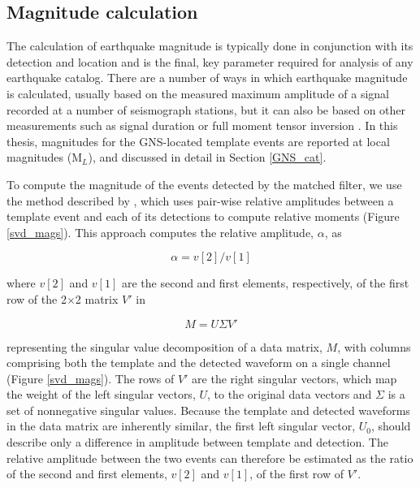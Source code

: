 \subsection{Magnitude calculation}
The calculation of earthquake magnitude is typically done in conjunction with its detection and location and is the final, key parameter required for analysis of any earthquake catalog. There are a number of ways in which earthquake magnitude is calculated, usually based on the measured maximum amplitude of a signal recorded at a number of seismograph stations, but it can also be based on other measurements such as signal duration or full moment tensor inversion \citep{Kanamori_1983}. In this thesis, magnitudes for the GNS-located template events are reported at local magnitudes (M$_L$), and discussed in detail in Section \ref{GNS_cat}.

To compute the magnitude of the events detected by the matched filter,
we use the method described by \citet{Shelly_2016}, which uses pair-wise relative amplitudes between a template event and each of its detections to compute relative moments (Figure \ref{svd_mags}). This approach computes the relative amplitude, $\alpha$, as

\begin{equation}
\alpha = v[2] / v[1]
\end{equation}

where $v[2]$ and $v[1]$ are the second and first elements, respectively, of the first row of the 2$\times$2 matrix $V'$ in

\begin{equation}
M = U\Sigma V'
\end{equation}

representing the singular value decomposition of a data matrix, $M$, with columns comprising both the template and the detected waveform on a single channel (Figure \ref{svd_mags}). The rows of $V'$ are the right singular vectors, which map the weight of the left singular vectors, $U$, to the original data vectors and $\Sigma$ is a set of nonnegative singular values. Because the template and detected waveforms in the data matrix are inherently similar, the first left singular vector, $U_0$, should describe only a difference in amplitude between template and detection. The relative amplitude between the two events can therefore be estimated as the ratio of the second and first elements, $v[2]$ and $v[1]$, of the first row of $V'$.

